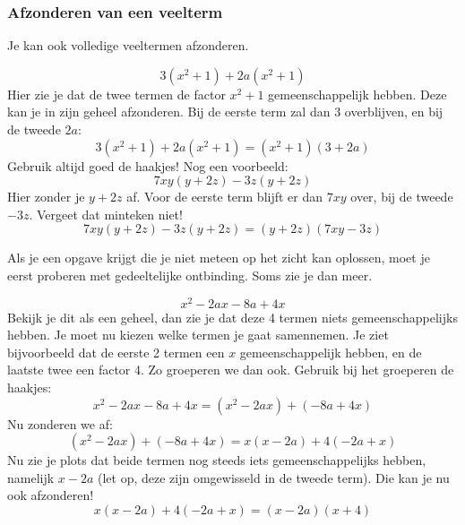 \subsubsection{Afzonderen van een veelterm}
Je kan ook volledige veeltermen afzonderen.
\begin{voorbeeld}
\begin{equation*}
3(x^2+1)+2a(x^2+1)
\end{equation*}
Hier zie je dat de twee termen de factor $x^2+1$ gemeenschappelijk hebben. Deze kan je in zijn geheel afzonderen. Bij de eerste term zal dan $3$ overblijven, en bij de tweede $2a$:
\begin{equation*}
3(x^2+1)+2a(x^2+1)=(x^2+1)(3+2a)
\end{equation*}
Gebruik altijd goed de haakjes! Nog een voorbeeld:
\begin{equation*}
7xy(y+2z)-3z(y+2z)
\end{equation*}
Hier zonder je $y+2z$ af. Voor de eerste term blijft er dan $7xy$ over, bij de tweede $-3z$. Vergeet dat minteken niet!
\begin{equation*}
7xy(y+2z)-3z(y+2z)=(y+2z)(7xy-3z)
\end{equation*}	
\end{voorbeeld}
Als je een opgave krijgt die je niet meteen op het zicht kan oplossen, moet je eerst proberen met gedeeltelijke ontbinding. Soms zie je dan meer.

\begin{voorbeeld}
	\begin{equation*}
x^2-2ax-8a+4x
\end{equation*}
Bekijk je dit als een geheel, dan zie je dat deze 4 termen niets gemeenschappelijks hebben. Je moet nu kiezen welke termen je gaat samennemen. Je ziet bijvoorbeeld dat de eerste 2 termen een $x$ gemeenschappelijk hebben, en de laatste twee een factor 4. Zo groeperen we dan ook. Gebruik bij het groeperen de haakjes:
\begin{equation*}
x^2-2ax-8a+4x=(x^2-2ax)+(-8a+4x)
\end{equation*}
Nu zonderen we af:
\begin{equation*}
(x^2-2ax)+(-8a+4x)=x(x-2a)+4(-2a+x)
\end{equation*}
Nu zie je plots dat beide termen nog steeds iets gemeenschappelijks hebben, namelijk $x-2a$ (let op, deze zijn omgewisseld in de tweede term). Die kan je nu ook afzonderen!
\begin{equation*}
x(x-2a)+4(-2a+x)=(x-2a)(x+4)
\end{equation*}

\end{voorbeeld}

